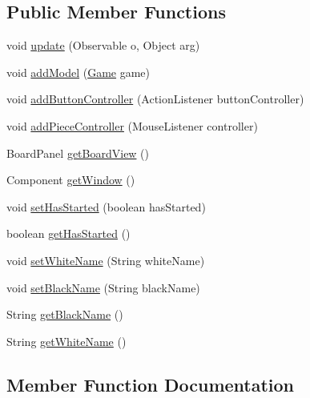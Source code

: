 \subsection*{Public Member Functions}
\begin{DoxyCompactItemize}
\item 
void \mbox{\hyperlink{classgui_1_1_view_a0b930eff54b741b4a9c9d666180dec00}{update}} (Observable o, Object arg)
\item 
void \mbox{\hyperlink{classgui_1_1_view_af87d7ce351a4529a91bd4cd6215270f3}{add\+Model}} (\mbox{\hyperlink{classgui_1_1_game}{Game}} game)
\item 
void \mbox{\hyperlink{classgui_1_1_view_aa348b4e60405ff1a3948e01b3bc1cf16}{add\+Button\+Controller}} (Action\+Listener button\+Controller)
\item 
void \mbox{\hyperlink{classgui_1_1_view_a66364784fcbb6df611784d77880e98bb}{add\+Piece\+Controller}} (Mouse\+Listener controller)
\item 
Board\+Panel \mbox{\hyperlink{classgui_1_1_view_ad5f7dc8f550cc8895c4da9b5ea8d4b98}{get\+Board\+View}} ()
\item 
Component \mbox{\hyperlink{classgui_1_1_view_aeb332c6eee8b72e856b4eae786e4c736}{get\+Window}} ()
\item 
void \mbox{\hyperlink{classgui_1_1_view_aef80a66972e0010e3ec6b0cd9899bc05}{set\+Has\+Started}} (boolean has\+Started)
\item 
boolean \mbox{\hyperlink{classgui_1_1_view_a958e1dcd8f0a252266b292bff7af26dd}{get\+Has\+Started}} ()
\item 
void \mbox{\hyperlink{classgui_1_1_view_a49679332bb9ef013e497a00188bf254d}{set\+White\+Name}} (String white\+Name)
\item 
void \mbox{\hyperlink{classgui_1_1_view_afe1af467431c5b0f21bf71ef0b869b21}{set\+Black\+Name}} (String black\+Name)
\item 
String \mbox{\hyperlink{classgui_1_1_view_a97fe9c5584520573e63ad4af1988e970}{get\+Black\+Name}} ()
\item 
String \mbox{\hyperlink{classgui_1_1_view_a0c82f77f67a8131b03a10d73cb9e5934}{get\+White\+Name}} ()
\end{DoxyCompactItemize}


\subsection{Member Function Documentation}
\mbox{\label{classgui_1_1_view_aa348b4e60405ff1a3948e01b3bc1cf16}} 
